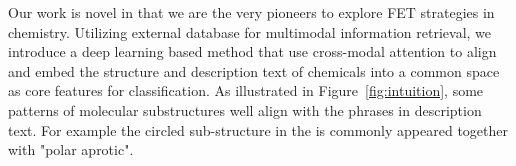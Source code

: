 

Our work is novel in that we are the very pioneers to explore FET strategies in chemistry. Utilizing external database for multimodal information retrieval, we introduce a deep learning based method that use cross-modal attention to align and embed the structure and description text of chemicals into a common space as core features for classification. %
As illustrated in Figure~\ref{fig:intuition}, %
some patterns of molecular substructures well align with the phrases in description text. For example the circled sub-structure in the is commonly appeared together with  "polar aprotic".





